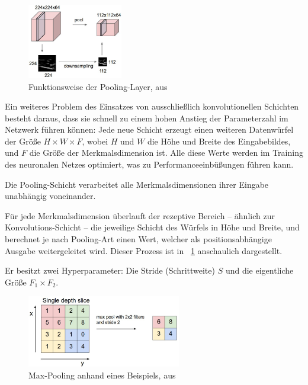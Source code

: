 \begin{figure}[h!]
	\centering
	\includegraphics[width=0.37\textwidth,keepaspectratio]{images/cs231n/pool.jpg}
	\caption{Funktionsweise der Pooling-Layer, aus \cite{cs231n}}
	\label{fig:pooling}
\end{figure}

Ein weiteres Problem des Einsatzes von ausschließlich konvolutionellen Schichten besteht daraus, dass sie schnell zu einem hohen Anstieg der Parameterzahl im Netzwerk führen können: Jede neue Schicht erzeugt einen weiteren Datenwürfel der Größe $H\times W\times F$, wobei $H$ und $W$ die Höhe und Breite des Eingabebildes, und $F$ die Größe der Merkmalsdimension ist. Alle diese Werte werden im Training des neuronalen Netzes optimiert, was zu Performanceeinbüßungen führen kann. \cite{cs231n}

Die Pooling-Schicht verarbeitet alle Merkmalsdimensionen ihrer Eingabe unabhängig voneinander.

Für jede Merkmalsdimension überlauft der rezeptive Bereich -- ähnlich zur Konvolutions-Schicht -- die jeweilige Schicht des Würfels in Höhe und Breite, und berechnet je nach Pooling-Art einen Wert, welcher als positionsabhängige Ausgabe weitergeleitet wird. Dieser Prozess ist in \figurename~\ref{fig:pooling} anschaulich dargestellt.

Er besitzt zwei Hyperparameter: Die Stride (Schrittweite) $S$ und die eigentliche Größe $F_1\times F_2$. \cite{cs231n}

\begin{figure}[H]
	\centering
	\includegraphics[width=0.6\textwidth,keepaspectratio]{images/cs231n/maxpool.jpg}
	\captionsetup{width=0.6\textwidth}
	\caption{Max-Pooling anhand eines Beispiels, aus \cite{cs231n}}
	\label{fig:maxpooling}
\end{figure}

